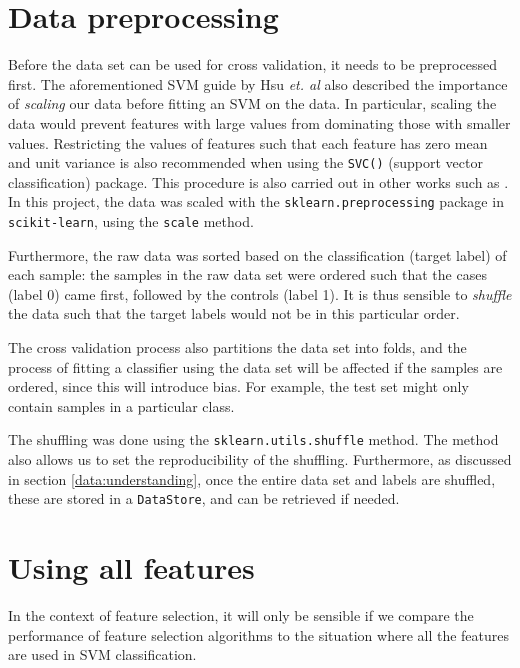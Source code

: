 \documentclass[12pt, twoside, a4paper]{report}
\begin{document}
\section{Data preprocessing}

Before the data set can be used for cross validation, it needs to be preprocessed first. The aforementioned SVM guide by Hsu \textit{et. al} also described the importance of \textit{scaling} our data before fitting an SVM on the data. In particular, scaling the data would prevent features with large values from dominating those with smaller values. Restricting the values of features such that each feature has zero mean and unit variance is also recommended when using the \texttt{SVC()} (support vector classification) package. This procedure is also carried out in other works such as \cite{RefWorks:228}. In this project, the data was scaled with the \texttt{sklearn.preprocessing} package in \texttt{scikit-learn}, using the \texttt{scale} method.

Furthermore, the raw data was sorted based on the classification (target label) of each sample: the samples in the raw data set were ordered such that the cases (label 0) came first, followed by the controls (label 1). It is thus sensible to \textit{shuffle} the data such that the target labels would not be in this particular order.

The cross validation process also partitions the data set into folds, and the process of fitting a classifier using the data set will be affected if the samples are ordered, since this will introduce bias. For example, the test set might only contain samples in a particular class.

The shuffling was done using the \texttt{sklearn.utils.shuffle} method. The method also allows us to set the reproducibility of the shuffling. Furthermore, as discussed in section \ref{data:understanding}, once the entire data set and labels are shuffled, these are stored in a \texttt{DataStore}, and can be retrieved if needed.



\section{Using all features} \label{data:all_features}

In the context of feature selection, it will only be sensible if we compare the performance of feature selection algorithms to the situation where all the features are used in SVM classification.
\end{document}

